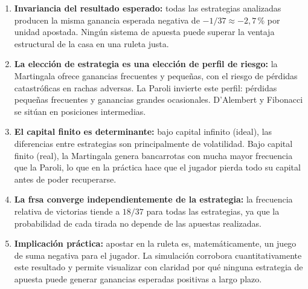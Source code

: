 \documentclass[a4paper, 11pt]{article}
\begin{document}
\begin{enumerate}
  \item \textbf{Invariancia del resultado esperado:} todas las estrategias
        analizadas producen la misma ganancia esperada negativa de
        $-1/37 \approx -2{,}7\,\%$ por unidad apostada. Ningún sistema
        de apuesta puede superar la ventaja estructural de la casa en una
        ruleta justa.

  \item \textbf{La elección de estrategia es una elección de perfil de riesgo:}
        la Martingala ofrece ganancias frecuentes y pequeñas, con el riesgo
        de pérdidas catastróficas en rachas adversas. La Paroli invierte
        este perfil: pérdidas pequeñas frecuentes y ganancias grandes
        ocasionales. D'Alembert y Fibonacci se sitúan en posiciones
        intermedias.

  \item \textbf{El capital finito es determinante:} bajo capital infinito
        (ideal), las diferencias entre estrategias son principalmente de
        volatilidad. Bajo capital finito (real), la Martingala genera
        bancarrotas con mucha mayor frecuencia que la Paroli, lo que en
        la práctica hace que el jugador pierda todo su capital antes de
        poder recuperarse.

  \item \textbf{La frsa converge independientemente de la estrategia:}
        la frecuencia relativa de victorias tiende a $18/37$ para todas las
        estrategias, ya que la probabilidad de cada tirada no depende de las
        apuestas realizadas.

  \item \textbf{Implicación práctica:} apostar en la ruleta es,
        matemáticamente, un juego de suma negativa para el jugador.
        La simulación corrobora cuantitativamente este resultado y permite
        visualizar con claridad por qué ninguna estrategia de apuesta
        puede generar ganancias esperadas positivas a largo plazo.
\end{enumerate}



\end{document}
